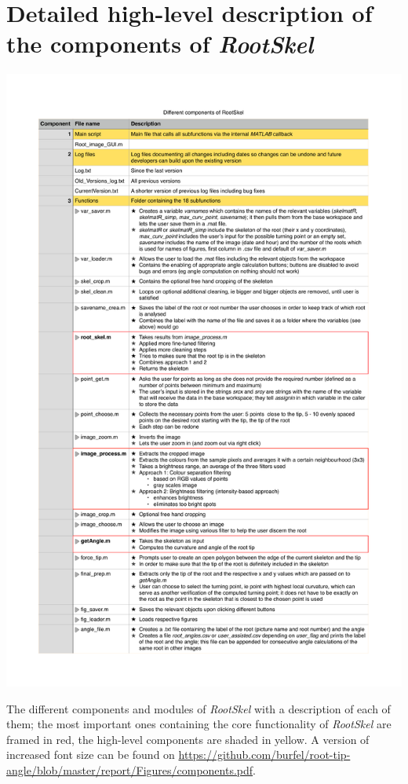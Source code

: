 

\chapter{Detailed high-level description of the components of \textit{RootSkel}}

\newpage
\begin{table}[H]
	\centering
	\includegraphics[width=1.\textwidth]{../Figures/components2.pdf}
	\caption{The different components and modules of \textit{RootSkel} with a description of each of them; the most important ones containing the core functionality of \textit{RootSkel} are framed in red, the high-level components are shaded in yellow. A version of increased font size can be found on \url{https://github.com/burfel/root-tip-angle/blob/master/report/Figures/components.pdf}.}
	\label{table:modules}
\end{table}



